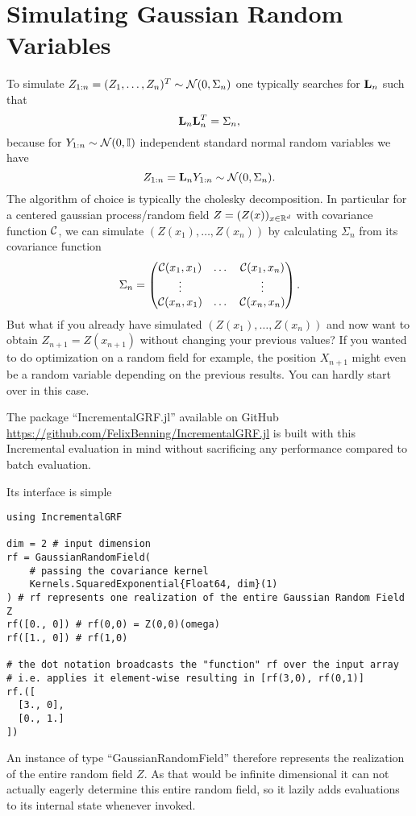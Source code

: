 \section{Simulating Gaussian Random Variables}

To simulate \(Z_{1:n} = (Z_1,\dots,Z_n)^T \sim \mathcal{N}(0, \Sigma_n)\) one typically
searches for \(\mathbf{L}_n\) such that
\[
	\mathbf{L}_n \mathbf{L}_n^T = \Sigma_n,
\]
because for \(Y_{1:n}\sim\mathcal{N}(0,\mathbb{I})\) independent standard normal
random variables we have
\[
	Z_{1:n} = \mathbf{L}_n Y_{1:n} \sim \mathcal{N}(0, \Sigma_n).
\]
The algorithm of choice is typically the cholesky decomposition.
In particular for a centered gaussian process/random field 
\(Z=(Z(x))_{x\in\mathbb{R}^d}\) with covariance function \(\mathcal{C}\),
we can simulate \((Z(x_1),\dots, Z(x_n))\) by calculating \(\Sigma_n\) from its
covariance function
\[
	\Sigma_n = \begin{pmatrix}
		\mathcal{C}(x_1, x_1) &\dots &\mathcal{C}(x_1, x_n)\\
		\vdots &  & \vdots \\
		\mathcal{C}(x_n, x_1) &\dots &\mathcal{C}(x_n, x_n)
	\end{pmatrix}.
\]
But what if you already have simulated \((Z(x_1),\dots,Z(x_n))\) and now want
to obtain \(Z_{n+1} = Z(x_{n+1})\) without changing your previous values? If you wanted
to do optimization on a random field for example, the position \(X_{n+1}\) might
even be a random variable depending on the previous results. You can hardly
start over in this case.

The package ``IncrementalGRF.jl'' available on GitHub
\url{https://github.com/FelixBenning/IncrementalGRF.jl} is built with this
Incremental evaluation in mind without sacrificing any performance compared to
batch evaluation.

Its interface is simple

\begin{verbatim}
using IncrementalGRF

dim = 2 # input dimension
rf = GaussianRandomField(
	# passing the covariance kernel
	Kernels.SquaredExponential{Float64, dim}(1)
) # rf represents one realization of the entire Gaussian Random Field Z
rf([0., 0]) # rf(0,0) = Z(0,0)(omega)
rf([1., 0]) # rf(1,0)

# the dot notation broadcasts the "function" rf over the input array
# i.e. applies it element-wise resulting in [rf(3,0), rf(0,1)]
rf.([
  [3., 0],
  [0., 1.]
])
\end{verbatim}
An instance of type ``GaussianRandomField'' therefore represents the realization
of the entire random field \(Z\). As that would be infinite dimensional it can
not actually eagerly determine this entire random field, so it lazily
adds evaluations to its internal state whenever invoked.

